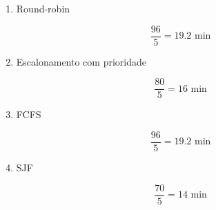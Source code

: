 \newpage

\begin{question}
  
    \begin{enumerate}[label=\textbf{\alph*})]

        \item Round-robin 
        
        \begin{equation*}
            \frac{96}{5} = 19.2 \text{ min }
        \end{equation*}

        \item Escalonamento com prioridade 
        
        \begin{equation*}
            \frac{80}{5} = 16 \text{ min }
        \end{equation*}

        \item FCFS 

        \begin{equation*}
            \frac{96}{5} = 19.2 \text{ min }
        \end{equation*}

        \item SJF 

        \begin{equation*}
            \frac{70}{5} = 14 \text{ min }
        \end{equation*}
    \end{enumerate}

\end{question}
